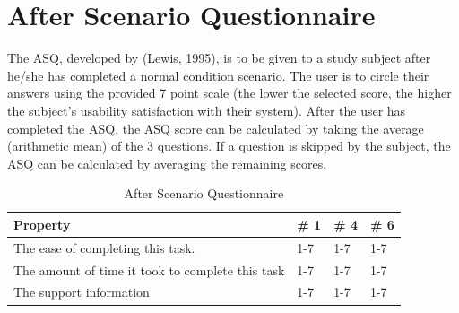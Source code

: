 \section{After Scenario Questionnaire}
The ASQ, developed by (Lewis, 1995), is to be given to a study subject after he/she has completed a normal condition scenario. The user is to circle their answers using the provided 7 point scale (the lower the selected score, the higher the subject’s usability satisfaction with their system). After the user has completed the ASQ, the ASQ score can be calculated by taking the average (arithmetic mean) of the 3 questions. If a question is skipped by the subject, the ASQ can be calculated by averaging the remaining scores.
\begin{table}[h]
	\begin{center}
		\begin{tabular}{| l | l | l | l |}
			\hline
			\textbf{Property} & \textbf{\# 1 }  & \textbf{\# 4 } & \textbf{\# 6 }\\
			\hline
			The ease of completing this task. & 1-7  & 1-7 & 1-7 \\
			\hline
			The amount of time it took to complete this task & 1-7 & 1-7 & 1-7 \\
			\hline
			The support information  & 1-7 & 1-7 & 1-7 \\
			\hline
		\end{tabular}
	\end{center}
	\caption{After Scenario Questionnaire}
\end{table}

